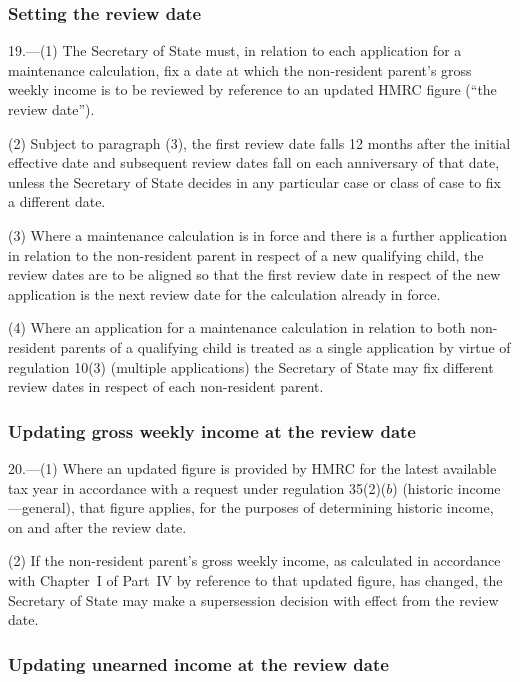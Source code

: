 \documentclass[12pt,a4paper]{article}
\begin{document}
\renewcommand\parthead{--- Part III Chapter IV}

\subsubsection[19. Setting the review date]{Setting the review date}

19.---(1)  The Secretary of State must, in relation to each application for a maintenance calculation, fix a date at which the non-resident parent’s gross weekly income is to be reviewed by reference to an updated HMRC figure (“the review date”).

(2) Subject to paragraph (3), the first review date falls 12 months after the initial effective date and subsequent review dates fall on each anniversary of that date, unless the Secretary of State decides in any particular case or class of case to fix a different date.

(3) Where a maintenance calculation is in force and there is a further application in relation to the non-resident parent in respect of a new qualifying child, the review dates are to be aligned so that the first review date in respect of the new application is the next review date for the calculation already in force.

(4) Where an application for a maintenance calculation in relation to both non-resident parents of a qualifying child is treated as a single application by virtue of regulation 10(3) (multiple applications) the Secretary of State may fix different review dates in respect of each non-resident parent.

\subsubsection[20. Updating gross weekly income at the review date]{Updating gross weekly income at the review date}

20.---(1)  Where an updated figure is provided by HMRC for the latest available tax year in accordance with a request under regulation 35(2)($b$)  (historic income---general), that figure applies, for the purposes of determining historic income, on and after the review date.

(2) If the non-resident parent’s gross weekly income, as calculated in accordance with Chapter~I of Part~IV by reference to that updated figure, has changed, the Secretary of State may make a supersession decision with effect from the review date.

\subsubsection[21. Updating unearned income at the review date]{Updating unearned income at the review date}
\end{document}
